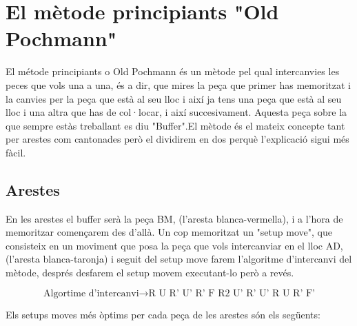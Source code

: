 \section{El mètode principiants "Old Pochmann"}

El métode principiants o Old Pochmann és un mètode pel qual intercanvies les peces que vols una a una, és a dir, que mires la peça que primer has memoritzat i la canvies per la peça que està al seu lloc i així ja tens una peça que està al seu lloc i una altra que has de col·locar, i així succesivament.
Aquesta peça sobre la que sempre estàs treballant es diu "Buffer".El mètode és el mateix concepte tant per arestes com cantonades però el dividirem en dos perquè l'explicació sigui més fàcil.

\subsection{Arestes}

En les arestes el buffer serà la peça BM, (l'aresta blanca-vermella), i a l'hora de memoritzar començarem des d'allà. Un cop memoritzat un "setup move", que consisteix en un moviment que posa la peça que vols intercanviar en el lloc AD, (l'aresta blanca-taronja) i seguit del setup move farem l'algoritme d'intercanvi del mètode, després desfarem el setup movem executant-lo però a revés.


$$ \textrm{Algortime d'intercanvi} \rightarrow \textrm{R U R' U' R' F R2 U' R' U' R U R' F'} $$

Els setups moves més òptims per cada peça de les arestes són els següents:

